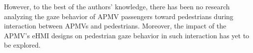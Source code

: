 However, to the best of the authors' knowledge, there has been no research analyzing the gaze behavior of APMV passengers toward pedestrians during interaction between APMVs and pedestrians. Moreover, the impact of the APMV's eHMI designs on pedestrian gaze behavior in such interaction has yet to be explored.












